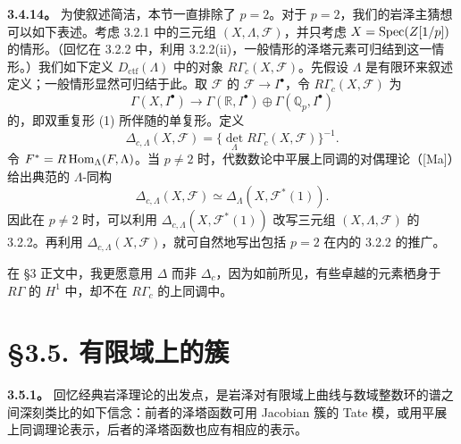 \textbf{3.4.14。} 为使叙述简洁，本节一直排除了 $p=2$。对于 $p=2$，我们的岩泽主猜想可以如下表述。考虑 3.2.1 中的三元组 $(X,\Lambda,\mathcal F)$，并只考虑 $X=\operatorname{Spec}(Z[1/p])$ 的情形。（回忆在 3.2.2 中，利用 3.2.2(ii)，一般情形的泽塔元素可归结到这一情形。）我们如下定义 $D_{\mathrm{ctf}}(\Lambda)$ 中的对象 $R\Gamma_c(X,\mathcal F)$。先假设 $\Lambda$ 是有限环来叙述定义；一般情形显然可归结于此。取 $\mathcal F$ 的 $\mathcal F\longrightarrow I^\bullet$，令 $R\Gamma_c(X,\mathcal F)$ 为
\begin{equation*}
 \Gamma(X,I^\bullet)\longrightarrow\Gamma(\mathbb R,I^\bullet)\oplus\Gamma(\mathbb Q_p,I^\bullet)\tag{1}
\end{equation*}
的，即双重复形 (1) 所伴随的单复形。定义
\[
 \Delta_{c,\Lambda}(X,\mathcal F)=\{\det_\Lambda R\Gamma_c(X,\mathcal F)\}^{-1}.
\]
令 $F^*=R\operatorname{Hom}_\Lambda(F,\Lambda)$。当 $p\ne2$ 时，代数数论中平展上同调的对偶理论（[Ma]）给出典范的 $\Lambda$-同构
\[
 \Delta_{c,\Lambda}(X,\mathcal F)\simeq\Delta_\Lambda(X,\mathcal F^*(1)).
\]
因此在 $p\ne2$ 时，可以利用 $\Delta_{c,\Lambda}(X,\mathcal F^*(1))$ 改写三元组 $(X,\Lambda,\mathcal F)$ 的 3.2.2。再利用 $\Delta_{c,\Lambda}(X,\mathcal F)$，就可自然地写出包括 $p=2$ 在内的 3.2.2 的推广。

在 §3 正文中，我更愿意用 $\Delta$ 而非 $\Delta_c$，因为如前所见，有些卓越的元素栖身于 $R\Gamma$ 的 $H^1$ 中，却不在 $R\Gamma_c$ 的上同调中。

\section*{§3.5. 有限域上的簇}
\textbf{3.5.1。} 回忆经典岩泽理论的出发点，是岩泽对有限域上曲线与数域整数环的谱之间深刻类比的如下信念：前者的泽塔函数可用 Jacobian 簇的 Tate 模，或用平展上同调理论表示，后者的泽塔函数也应有相应的表示。

